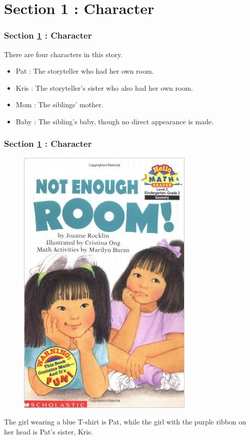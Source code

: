 \documentclass{beamer}
\begin{document}
	\setcounter{section}{0}
	
	\section{Section 1 : Character}\label{sec:character}%
	\begin{frame}
		\frametitle{Section \ref{sec:character} : Character}
		There are four characters in this story.
		\begin{itemize}
			\item Pat : The storyteller who had her own room.
			\item Kris : The storyteller's sister who also had her own room.
			\item Mom : The siblings' mother.
			\item Baby : The sibling's baby, though no direct appearance is made.
		\end{itemize}
	\end{frame}
	
	\begin{frame}
		\frametitle{Section \ref{sec:character} : Character}
		\begin{figure}
			\centering
			\includegraphics[scale=0.3]{res/cover.jpg}
		\end{figure}
		The girl wearing a blue T-shirt is Pat, while the girl with the purple ribbon on her head is Pat's sister, Kris.
	\end{frame}
	
\end{document}
